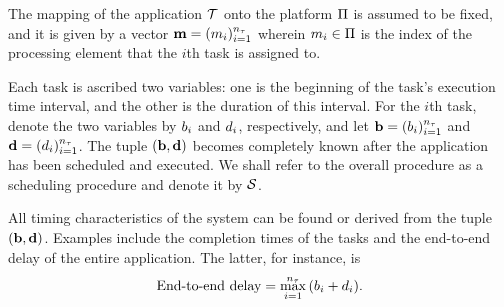 The mapping of the application $\mathcal{T}$ onto the platform $\Pi$ is assumed to
be fixed, and it is given by a vector $\mathbf{m} = (m_i)_{i = 1}^{{n_\tau}}$ wherein
$m_i \in \Pi$ is the index of the processing element that the $i$th task is
assigned to.

Each task is ascribed two variables: one is the beginning of the task's
execution time interval, and the other is the duration of this interval. For the
$i$th task, denote the two variables by $b_i$ and $d_i$, respectively, and let
$\mathbf{b} = (b_i)_{i=1}^{{n_\tau}}$ and $\mathbf{d} = (d_i)_{i=1}^{{n_\tau}}$. The tuple $(\mathbf{b},
\mathbf{d})$ becomes completely known after the application has been scheduled and
executed. We shall refer to the overall procedure as a scheduling procedure and
denote it by $\mathcal{S}$.

All timing characteristics of the system can be found or derived from the tuple
$(\mathbf{b}, \mathbf{d})$. Examples include the completion times of the tasks and the
end-to-end delay of the entire application. The latter, for instance, is
\[
  \text{End-to-end delay} = \max_{i = 1}^{n_\tau} \, (b_i + d_i).
\]
